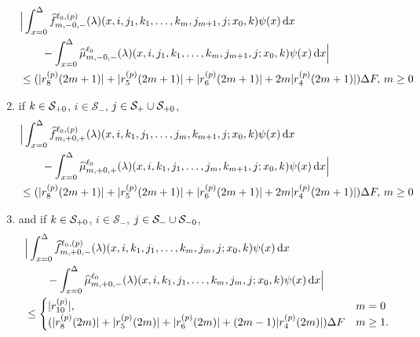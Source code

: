 \begin{cor}
\begin{enumerate}
	\begin{align}
                	&\Big|\int_{x=0}^\Delta \widehat{f}_{m,-0,-}^{\ell_0,(p)}(\lambda)(x,i,j_1,k_1,\dots,k_m,j_{m+1},j;x_0,k)\psi(x)\, \mathrm{d} x\nonumber 
                	\\&\qquad{} -\int_{x=0}^\Delta \widehat \mu_{m,-0,-}^{\ell_0}(\lambda)(x,i,j_1,k_1,\dots,k_m,j_{m+1},j;x_0,k)\psi(x)\, \mathrm{d} x\Big|\nonumber 
	\\&\leq   (|r_8^{(p)}(2m+1)|+|r_5^{(p)}(2m+1)|+|r_6^{(p)}(2m+1)| + 2m|r_4^{(p)}(2m+1)|)\Delta F,\,  m \geq 0   \label{eqn: MMv22}
	\end{align}
	\item {if \(k\in\mathcal{S}_{+0}\), \(i\in\mathcal S_-\), \(j\in\mathcal{S}_+\cup\mathcal{S}_{+0}\),}
	\begin{align}
                	&\Big|\int_{x=0}^\Delta \widehat{f}_{m,+0,+}^{\ell_0,(p)}(\lambda)(x,i,k_1,j_1,\dots,j_m,k_{m+1},j;x_0,k)\psi(x) \, \mathrm{d} x \nonumber 
                	\\&\qquad{} - \int_{x=0}^\Delta \widehat \mu_{m,+0,+}^{\ell_0}(\lambda)(x,i,k_1,j_1,\dots,j_m,k_{m+1},j;x_0,k)\psi(x) \, \mathrm{d} x\Big| \nonumber 
	\\&\leq   (|r_8^{(p)}(2m+1)|+|r_5^{(p)}(2m+1)|+|r_6^{(p)}(2m+1)| + 2m|r_4^{(p)}(2m+1)|)\Delta F,\,  m \geq 0   \label{eqn: MMv222}
	\end{align}
	\item {and if \(k\in\mathcal{S}_{+0}\), \(i\in\mathcal S_-\), \(j\in\mathcal{S}_-\cup\mathcal{S}_{-0}\),}
	\begin{align}
                	&\Big|\int_{x=0}^\Delta \widehat{f}_{m,+0,-}^{\ell_0,(p)}(\lambda)(x,i,k_1,j_1,\dots,k_{m},j_{m},j;x_0,k)\psi(x) \, \mathrm{d} x\nonumber 
                	\\&\qquad{}-\int_{x=0}^\Delta \widehat{\mu}_{m,+0,-}^{\ell_0}(\lambda)(x,i,k_1,j_1,\dots,k_{m},j_{m},j;x_0,k)\psi(x)\, \mathrm{d} x\Big| \nonumber 
	\\&\leq \begin{cases}  |r_{10}^{(p)}|, & m=0 \\( |r_8^{(p)}(2m)|+|r_5^{(p)}(2m)|+|r_6^{(p)}(2m)| + (2m-1)|r_4^{(p)}(2m)|)\Delta F & m \geq 1. \end{cases}\label{eqn: MMv2}
	\end{align}
	\end{enumerate}
\end{cor}
